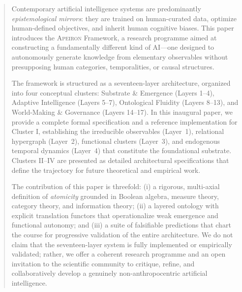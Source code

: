 \begin{abstract}
Contemporary artificial intelligence systems are predominantly \emph{epistemological mirrors}: they are trained on human-curated data, optimize human-defined objectives, and inherit human cognitive biases. This paper introduces the \textsc{Apeiron} Framework, a research programme aimed at constructing a fundamentally different kind of AI---one designed to autonomously generate knowledge from elementary observables without presupposing human categories, temporalities, or causal structures.

The framework is structured as a seventeen-layer architecture, organized into four conceptual clusters: Substrate \& Emergence (Layers 1--4), Adaptive Intelligence (Layers 5--7), Ontological Fluidity (Layers 8--13), and World-Making \& Governance (Layers 14--17). In this inaugural paper, we provide a complete formal specification and a reference implementation for Cluster I, establishing the irreducible observables (Layer~1), relational hypergraph (Layer~2), functional clusters (Layer~3), and endogenous temporal dynamics (Layer~4) that constitute the foundational substrate. Clusters II--IV are presented as detailed architectural specifications that define the trajectory for future theoretical and empirical work.

The contribution of this paper is threefold: (i) a rigorous, multi-axial definition of \emph{atomicity} grounded in Boolean algebra, measure theory, category theory, and information theory; (ii) a layered ontology with explicit translation functors that operationalize weak emergence and functional autonomy; and (iii) a suite of falsifiable predictions that chart the course for progressive validation of the entire architecture. We do not claim that the seventeen-layer system is fully implemented or empirically validated; rather, we offer a coherent research programme and an open invitation to the scientific community to critique, refine, and collaboratively develop a genuinely non-anthropocentric artificial intelligence.
\end{abstract}